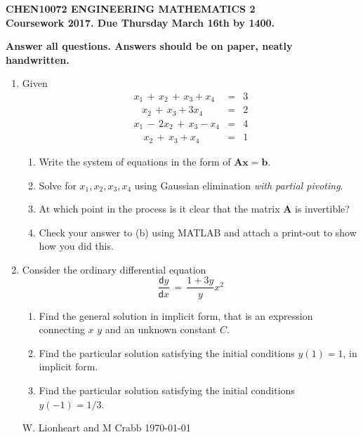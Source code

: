\documentclass[12pt]{article}
\def\bA{\mathbf{A}}
\newcommand{\dif}{\mathsf{d}}
\begin{document}
\begin{center}{\bf\large
CHEN10072 ENGINEERING MATHEMATICS 2
\\
Coursework 2017. Due Thursday March 16th by 1400. 
}
\end{center}
\begin{center}{\bf
Answer all questions. Answers should be on paper, neatly handwritten.
}
\end{center}

\begin{enumerate}

\item 
Given
\vspace{-0.5cm}
\begin{eqnarray*}
x_1\,+\,x_2\,+\,x_3 + x_4&=&3\\
\,\,\,\,\,x_2\,+\,x_3 + 3x_4&=&2\\
x_1\,-\,2x_2\,+\,x_3 - x_4&=&4\\
\,\,\,\,\,\,x_2\,+\,x_3 + x_4&=&1
\end{eqnarray*}
            \begin{enumerate}
            \item Write the system of  equations in the form of $\bA \mathbf{x}=\mathbf{b}$.
             
            \item  Solve for $x_1,x_2,x_3,x_4$ using Gaussian elimination {\em with partial  pivoting}.
            \item At which point in the process is it clear that the matrix $\mathbf{A}$ is invertible?
            \item Check your answer to (b) using  MATLAB and attach a print-out to show how you did this.
    \end{enumerate}
	

\item
Consider the ordinary differential equation
$$ \frac{\dif y}{\dif x}\,=\,  \frac{1+3y}{y} x^2 $$
\begin{enumerate}
\item
Find the general solution in implicit form, that is an expression connecting  $x$ $y$ and an unknown constant $C$.
\item Find the particular solution satisfying the initial conditions $y(1)=1$,  in implicit form. 
\item Find the particular solution satisfying the initial conditions $y(-1)=1/3$. 
\end{enumerate}
\vspace{5cm}

\tiny{W. Lionheart and M Crabb \today}



\end{enumerate}
\end{document}
